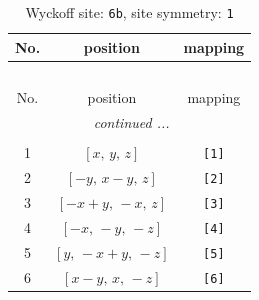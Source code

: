 \documentclass[fleqn,8pt]{jsarticle}
\begin{document}
\begin{longtable}{ccc}
\caption{Wyckoff site: {\tt 6b}, site symmetry: {\tt 1}}
 \\
 \hline \hline
No. & position & mapping \\ \hline \endfirsthead

\multicolumn{2}{l}{\tablename\ \thetable{}} \\
 \hline \hline
No. & position & mapping \\ \hline \endhead

 \hline \hline
\multicolumn{2}{r}{\footnotesize\it continued ...} \\ \endfoot

 \hline \hline
\multicolumn{2}{r}{} \\ \endlastfoot

1 & $\left[ x,\, y,\, z \right]$ & {\tt [1]} \\ \hline
2 & $\left[ - y,\, x - y,\, z \right]$ & {\tt [2]} \\ \hline
3 & $\left[ - x + y,\, - x,\, z \right]$ & {\tt [3]} \\ \hline
4 & $\left[ - x,\, - y,\, - z \right]$ & {\tt [4]} \\ \hline
5 & $\left[ y,\, - x + y,\, - z \right]$ & {\tt [5]} \\ \hline
6 & $\left[ x - y,\, x,\, - z \right]$ & {\tt [6]} \\
\end{longtable}
\end{document}
